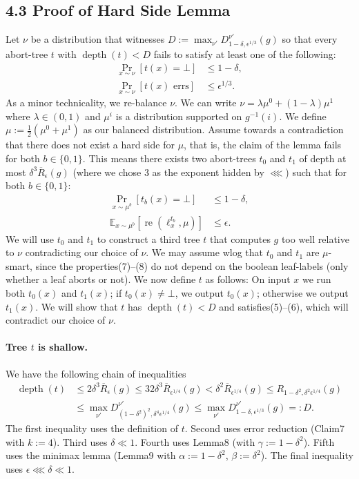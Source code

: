 \subsection*{4.3 Proof of Hard Side Lemma}
Let $\nu$ be a distribution that witnesses $D:=\max_{\nu'}D^{\nu'}_{1-\delta,\epsilon^{1/3}}(g)$ so that every abort-tree $t$ with $\operatorname{depth}(t)<D$ fails to satisfy at least one of the following:
\begin{align}\Pr_{x\sim\nu}[t(x)=\bot]&\le1-\delta,\tag{5}\\\Pr_{x\sim\nu}[t(x)\text{ errs}]&\le\epsilon^{1/3}.\tag{6}\end{align}
As a minor technicality, we re-balance $\nu$. We can write $\nu=\lambda\mu^0+(1-\lambda)\mu^1$ where $\lambda\in(0,1)$ and $\mu^i$ is a distribution supported on $g^{-1}(i)$. We define $\mu:=\frac12(\mu^0+\mu^1)$ as our balanced distribution.
Assume towards a contradiction that there does not exist a hard side for $\mu$, that is, the claim of the lemma fails for both $b\in\{0,1\}$. This means there exists two abort-trees $t_0$ and $t_1$ of depth at most $\delta^3\overline R_\epsilon(g)$ (where we chose 3 as the exponent hidden by $\lll$) such that for both $b\in\{0,1\}$:
\begin{align}\Pr_{x\sim\mu^b}[t_b(x)=\bot]&\le1-\delta,\tag{7}\\\mathbb E_{x\sim\mu^b}[\operatorname{re}(\ell_x^{t_b},\mu)]&\le\epsilon.\tag{8}\end{align}
We will use $t_0$ and $t_1$ to construct a third tree $t$ that computes $g$ too well relative to $\nu$ contradicting our choice of $\nu$. We may assume wlog that $t_0$ and $t_1$ are $\mu$-smart, since the properties(7)--(8) do not depend on the boolean leaf-labels (only whether a leaf aborts or not). We now define $t$ as follows: On input $x$ we run both $t_0(x)$ and $t_1(x)$; if $t_0(x)\ne\bot$, we output $t_0(x)$; otherwise we output $t_1(x)$. We will show that $t$ has $\operatorname{depth}(t)<D$ and satisfies(5)--(6), which will contradict our choice of $\nu$.
\paragraph{Tree $t$ is shallow.} We have the following chain of inequalities
\begin{align*}
\operatorname{depth}(t)&\le2\delta^3\overline R_\epsilon(g)\le32\delta^3\overline R_{\epsilon^{1/4}}(g)<\delta^2\overline R_{\epsilon^{1/4}}(g)\le R_{1-\delta^2,\delta^2\epsilon^{1/4}}(g)\\
&\le\max_{\nu'}D^{\nu'}_{(1-\delta^2)^2,\delta^4\epsilon^{1/4}}(g)\le\max_{\nu'}D^{\nu'}_{1-\delta,\epsilon^{1/3}}(g)=:D.
\end{align*}
The first inequality uses the definition of $t$. Second uses error reduction (Claim7 with $k:=4$). Third uses $\delta\ll1$. Fourth uses Lemma8 (with $\gamma:=1-\delta^2$). Fifth uses the minimax lemma (Lemma9 with $\alpha:=1-\delta^2$, $\beta:=\delta^2$). The final inequality uses $\epsilon\lll\delta\ll1$.
